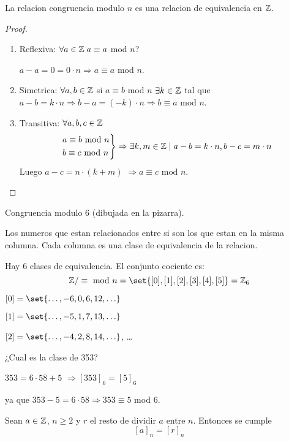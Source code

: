 \begin{proposition}
	La relacion congruencia modulo \(n \) es una relacion de equivalencia en \(\mathbb{Z} \).
\end{proposition}
\begin{proof}
	~\begin{enumerate}
		\item Reflexiva: \(\forall  a \in \mathbb{Z} \; a \equiv a \) mod \(n \)?
		      
		      \(a - a = 0 = 0 \cdot n \Rightarrow a \equiv a \) mod \(n \).
		\item Simetrica: \(\forall a,b \in \mathbb{Z} \) si \(a \equiv b \) mod \(n \) \(\exists k \in \mathbb{Z} \) tal que \(a - b = k \cdot n \Rightarrow b - a = (-k) \cdot n \Rightarrow b \equiv a \text{ mod } n \).
		\item Transitiva: \(\forall a,b,c \in \mathbb{Z} \)
		      \[
			      \begin{rcases}
				      a \equiv b \text{ mod } n \\
				      b \equiv c \text{ mod } n
			      \end{rcases} \Rightarrow \exists k, m \in \mathbb{Z} \mid a - b = k \cdot n, b - c = m \cdot n
		      \]
		      Luego \(a - c = n \cdot (k + m )\) \(\Rightarrow a \equiv c \text{ mod } n \).
	\end{enumerate}
\end{proof}
\begin{example}
	Congruencia modulo 6 (dibujada en la pizarra).
	
	Los numeros que estan relacionados entre si son los que estan en la misma columna. Cada columna es una clase de equivalencia de la relacion.
	
	Hay 6 clases de equivalencia. El conjunto cociente es:
	\[
		\Z / \equiv \text{ mod } n = \set{[0],[1],[2],[3],[4],[5]} = \Z_6
	\]
	
	\([0] = \set{\ldots, -6, 0, 6, 12, \ldots }\)
	
	\([1] = \set{\ldots,-5,1,7,13,\ldots }\)
	
	\([2] = \set{\ldots,-4,2,8,14,\ldots }\), \dots
\end{example}
\begin{example}
	¿Cual es la clase de 353?
	
	\(353 = 6 \cdot 58 + 5 \) \(\Rightarrow [353]_6 = [5]_6\)
	
	ya que \(353 - 5 = 6 \cdot 58 \Rightarrow 353 \equiv 5 \) mod \(6 \).
\end{example}

\begin{proposition}
	Sean \(a \in \mathbb{Z} \), \(n \geq 2 \) y \(r \) el resto de dividir \(a \) entre \(n \). Entonces se cumple
	\[
		[a]_n = [r]_n
	\]
\end{proposition}

